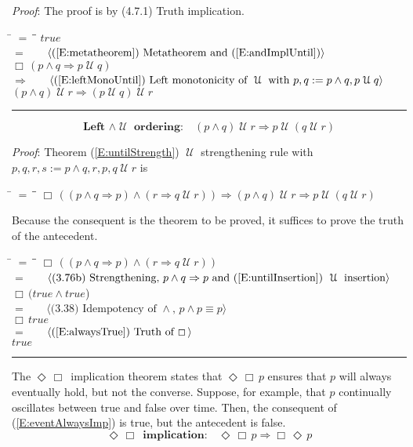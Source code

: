 \documentclass[12pt, fleqn, leqno]{article}
\newcommand{\lgap}{2pt}                             %
\newcommand{\mymathindent}{24pt}                    %
\newcommand{\impl}{\ensuremath{\Rightarrow}}        %
\newcommand{\Until}{\;\mathcal{U}\;}
\newcommand{\Event}{\Diamond\,}
\newcommand{\Always}{\Box\,}
\newcommand{\myqed}{\rule[-.23ex]{1.2ex}{2.0ex}}
\newcommand{\myqedtab}{\hspace{384pt}}              %
\newcommand{\Gll} {\langle}                         %
\newcommand{\Ggg} {\rangle}                         %
\newcommand{\Hint}[1]     {\ \ \ $\Gll              \mbox{#1} \Ggg$ }   %
\begin{document}
\emph{Proof}: The proof is by (4.7.1) Truth implication.
\begin{tabbing}
\hspace{\mymathindent} \= $= \;$ \= \myqedtab \= \kill
  \> \>   $true$\\[\lgap]
  \> $=$ \> \Hint{(\ref{E:metatheorem}) Metatheorem and (\ref{E:andImplUntil})} \\[\lgap]
  \> \>   $\Always (p \land q \impl p\Until q)$\\[\lgap]
  \> $\impl$  \>  \Hint{(\ref{E:leftMonoUntil}) Left monotonicity of $\Until$ with $p,q := p \land q, p\Until q$}\\[\lgap]
  \> \>   $(p \land q) \Until r \impl (p\Until q)\Until r$ \quad \myqed
\end{tabbing}
\begin{equation}\label{E:leftStrengthUntil}
\textbf{Left $\land\Until$ ordering:}\quad (p \land q) \Until r \impl p\Until (q\Until r)
\end{equation}

\emph{Proof}: Theorem (\ref{E:untilStrength}) $\Until$ strengthening rule with $p,q,r,s := p \land q, r, p, q\Until r$ is
\begin{tabbing}
\hspace{\mymathindent} \= $= \;$ \= \myqedtab \= \kill
\> \> $\Always ((p \land q \impl p) \land (r \impl q \Until r)) \impl (p \land q) \Until r \impl p\Until (q\Until r)$
\end{tabbing}
Because the consequent is the theorem to be proved, it suffices to prove the truth of the antecedent.

\begin{tabbing}
\hspace{\mymathindent} \= $= \;$ \= \myqedtab \= \kill
  \> \>   $\Always ((p \land q \impl p) \land (r \impl q \Until r))$\\[\lgap]
  \> $=$  \>  \Hint{(3.76b) Strengthening, $p\land q \impl p$ and (\ref{E:untilInsertion}) $\Until$ insertion}\\[\lgap]
  \> \>   $\Always (true \land true$)\\[\lgap]
  \> $=$  \>  \Hint{(3.38) Idempotency of $\land$, $p\land p \equiv p$}\\[\lgap]
  \> \>   $\Always true$\\[\lgap]
  \> $=$  \>  \Hint{(\ref{E:alwaysTrue}) Truth of $\Always$}\\[\lgap]
  \> \>   $true$ \quad \myqed
\end{tabbing}

The $\Event\Always$ implication theorem states that $\Event\Always p$ ensures that $p$ will always eventually hold, but not the converse.
Suppose, for example, that $p$ continually oscillates between true and false over time.
Then, the consequent of (\ref{E:eventAlwaysImp}) is true, but the antecedent is false.
\begin{equation}\label{E:eventAlwaysImp}
\textbf{$\Event \Always$ implication:}\quad \Event\Always p \impl \Always\Event p
\end{equation}
\end{document}
